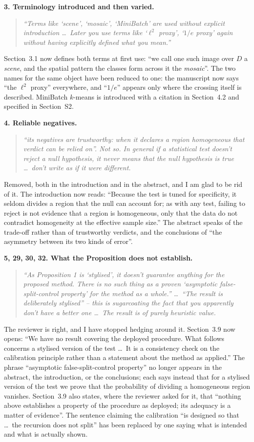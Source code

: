 \documentclass[11pt]{article}
\newcommand{\R}[1]{\medskip\noindent\textbf{#1}\quad}
\newenvironment{rquote}{\begin{quote}\itshape}{\end{quote}}
\begin{document}
\R{3. Terminology introduced and then varied.}
\begin{rquote}
``Terms like `scene', `mosaic', `MiniBatch' are used without explicit
introduction \dots\ Later you use terms like `$\ell^2$ proxy', `$1/e$ proxy'
again without having explicitly defined what you mean.''
\end{rquote}
Section~3.1 now defines both terms at first use: ``we call one such image over
$D$ a \emph{scene}, and the spatial pattern the classes form across it the
\emph{mosaic}''. The two names for the same object have been reduced to one:
the manuscript now says ``the $\ell^{2}$ proxy'' everywhere, and ``$1/e$''
appears only where the crossing itself is described. MiniBatch $k$-means is
introduced with a citation in Section~4.2 and specified in Section~S2.

\R{4. Reliable negatives.}
\begin{rquote}
``its negatives are trustworthy: when it declares a region homogeneous that
verdict can be relied on''. Not so. In general if a statistical test doesn't
reject a null hypothesis, it never means that the null hypothesis is true
\dots\ don't write as if it were different.
\end{rquote}
Removed, both in the introduction and in the abstract, and I am glad to be rid
of it. The introduction now reads: ``Because the test is tuned for specificity,
it seldom divides a region that the null can account for; as with any test,
failing to reject is not evidence that a region is homogeneous, only that the
data do not contradict homogeneity at the effective sample size.'' The abstract
speaks of the trade-off rather than of trustworthy verdicts, and the
conclusions of ``the asymmetry between its two kinds of error''.

\R{5, 29, 30, 32. What the Proposition does not establish.}
\begin{rquote}
``As Proposition 1 is `stylised', it doesn't guarantee anything for the
proposed method. There is no such thing as a proven `asymptotic
false-split-control property' for the method as a whole.'' \dots\ ``The
result is deliberately stylised'' -- this is sugarcoating the fact that you
apparently don't have a better one \dots\ The result is of purely heuristic
value.
\end{rquote}
The reviewer is right, and I have stopped hedging around it. Section~3.9 now
opens: ``We have no result covering the deployed procedure. What follows
concerns a stylised version of the test \dots\ It is a consistency check on the
calibration principle rather than a statement about the method as applied.''
The phrase ``asymptotic false-split-control property'' no longer appears in the
abstract, the introduction, or the conclusions; each says instead that for a
stylised version of the test we prove that the probability of dividing a
homogeneous region vanishes. Section~3.9 also states, where the reviewer asked
for it, that ``nothing above establishes a property of the procedure as
deployed; its adequacy is a matter of evidence''. The sentence claiming the
calibration ``is designed so that \dots\ the recursion does not split'' has
been replaced by one saying what is intended and what is actually shown.
\end{document}
